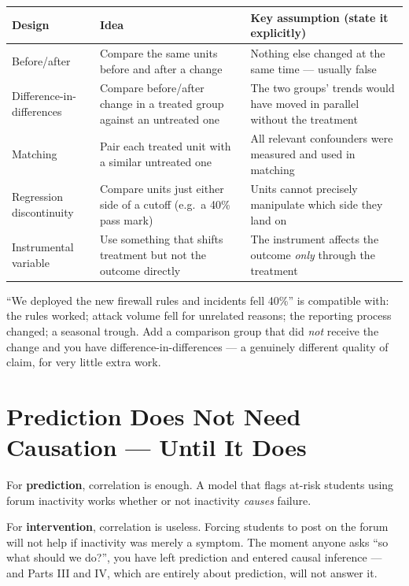 \begin{longtable}{@{}L{3.5cm}L{5.2cm}L{5.8cm}@{}}
\toprule
{}
\textbf{Design} & \textbf{Idea} & \textbf{Key assumption (state it explicitly)} \\
\midrule
\endhead
Before/after & Compare the same units before and after a change & Nothing else changed at the same time --- usually false \\
Difference-in-differences & Compare before/after change in a treated group against an untreated one & The two groups' trends would have moved in parallel without the treatment \\
Matching & Pair each treated unit with a similar untreated one & All relevant confounders were measured and used in matching \\
Regression discontinuity & Compare units just either side of a cutoff (e.g.\ a 40\% pass mark) & Units cannot precisely manipulate which side they land on \\
Instrumental variable & Use something that shifts treatment but not the outcome directly & The instrument affects the outcome \emph{only} through the treatment \\
\bottomrule
\end{longtable}

\begin{alertbox}
``We deployed the new firewall rules and incidents fell 40\%'' is compatible with:
the rules worked; attack volume fell for unrelated reasons; the reporting process
changed; a seasonal trough. Add a comparison group that did \emph{not} receive the
change and you have difference-in-differences --- a genuinely different quality of
claim, for very little extra work.
\end{alertbox}

\section{Prediction Does Not Need Causation --- Until It Does}

\begin{conceptbox}
For \textbf{prediction}, correlation is enough. A model that flags at-risk students
using forum inactivity works whether or not inactivity \emph{causes} failure.

For \textbf{intervention}, correlation is useless. Forcing students to post on the
forum will not help if inactivity was merely a symptom. The moment anyone asks
``so what should we do?'', you have left prediction and entered causal inference
--- and Parts III and IV, which are entirely about prediction, will not answer it.
\end{conceptbox}


